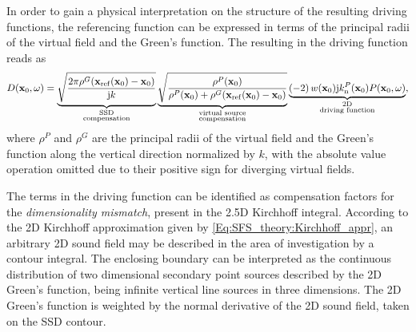 In order to gain a physical interpretation on the structure of the resulting driving functions, the referencing function can be expressed in terms of the principal radii of the virtual field and the Green's function. 
The resulting in the driving function reads as
\begin{equation}
D(\mathbf{x}_0, \omega) = 
\underbrace{\sqrt{\frac{2\pi \rho^G(\mathbf{x}_{\mathrm{ref}}(\mathbf{x}_0)-\mathbf{x}_0) }{\mathrm{j} k}}}_{{\substack{\text{SSD}\\\text{compensation}}}}
\underbrace{\sqrt{ \frac{\rho^P(\mathbf{x}_0) }{\rho^P(\mathbf{x}_0) +  \rho^G(\mathbf{x}_{\mathrm{ref}}(\mathbf{x}_0)-\mathbf{x}_0) } }}_{{\substack{\text{virtual source}\\\text{compensation}}}}
\underbrace{\left(-2\right) w(\mathbf{x}_0)  \mathrm{j} k_{\mathrm{n}}^P(\mathbf{x}_0) 	P(\mathbf{x}_0,\omega)}_{\substack{\text{2D}\\\text{driving function}}},
\end{equation}
where $\rho^P$ and $\rho^G$ are the principal radii of the virtual field and the Green's function along the vertical direction normalized by $k$, with the absolute value operation omitted due to their positive sign for diverging virtual fields.

The terms in the driving function can be identified as compensation factors for the \emph{dimensionality mismatch}, present in the 2.5D Kirchhoff integral.
According to the 2D Kirchhoff approximation given by \eqref{Eq:SFS_theory:Kirchhoff_appr}, an arbitrary 2D sound field may be described in the area of investigation by a contour integral.
The enclosing boundary can be interpreted as the continuous distribution of two dimensional secondary point sources described by the 2D Green's function, being infinite vertical line sources in three dimensions.
The 2D Green's function is weighted by the normal derivative of the 2D sound field, taken on the SSD contour.

